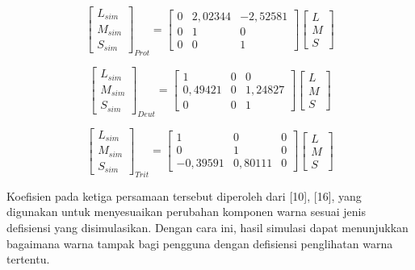 \begin{equation}
\begin{bmatrix} L_{sim} \\ M_{sim} \\ S_{sim} \end{bmatrix}_{Prot} =
\begin{bmatrix} 0 & 2{,}02344 & -2{,}52581 \\ 0 & 1 & 0 \\ 0 & 0 & 1 \end{bmatrix}
\begin{bmatrix} L \\ M \\ S \end{bmatrix}
\end{equation}

\begin{equation}
\begin{bmatrix} L_{sim} \\ M_{sim} \\ S_{sim} \end{bmatrix}_{Deut} =
\begin{bmatrix} 1 & 0 & 0 \\ 0{,}49421 & 0 & 1{,}24827 \\ 0 & 0 & 1 \end{bmatrix}
\begin{bmatrix} L \\ M \\ S \end{bmatrix}
\end{equation}

\begin{equation}
\begin{bmatrix} L_{sim} \\ M_{sim} \\ S_{sim} \end{bmatrix}_{Trit} =
\begin{bmatrix} 1 & 0 & 0 \\ 0 & 1 & 0 \\ -0{,}39591 & 0{,}80111 & 0 \end{bmatrix}
\begin{bmatrix} L \\ M \\ S \end{bmatrix}
\end{equation}

Koefisien pada ketiga persamaan tersebut diperoleh dari [10], [16], yang digunakan untuk menyesuaikan perubahan komponen warna sesuai jenis defisiensi yang disimulasikan. Dengan cara ini, hasil simulasi dapat menunjukkan bagaimana warna tampak bagi pengguna dengan defisiensi penglihatan warna tertentu.

